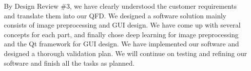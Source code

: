 By Design Review \#3, we have clearly understood the customer requirements and
translate them into our QFD. We designed a software solution mainly consists of
image preprocessing and GUI design. We have come up with several concepts for
each part, and finally chose deep learning for image preprocessing and the Qt
framework for GUI design. We have implemented our software and designed a
thorough validation plan. We will continue on testing and refining our software
and finish all the tasks as planned.
